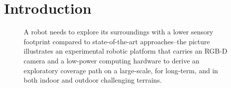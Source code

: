\documentclass[lettersize,journal]{IEEEtran}
\theoremstyle{definition}
\begin{document}
\section{Introduction}

\begin{figure}

\vspace*{-.5cm}
  
  \caption{A robot needs to explore its surroundings with a lower sensory footprint compared to state-of-the-art approaches--the picture illustrates an experimental robotic platform that carries an RGB-D camera and a low-power computing hardware to derive an exploratory coverage path on a large-scale, for long-term, and in both indoor and outdoor challenging terrains.}
  \vspace*{-.6cm}
  \label{fig:0}
\end{figure}
\end{document}
